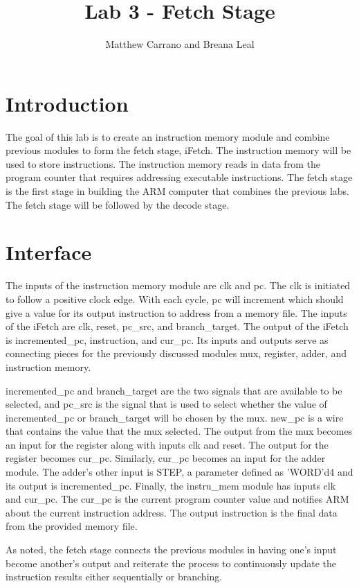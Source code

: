 \documentclass{article}
\author{Matthew Carrano and Breana Leal}
\title{Lab 3 - Fetch Stage}
\begin{document}
\maketitle

\section{Introduction}
The goal of this lab is to create an instruction memory module and combine previous modules to form the fetch stage, iFetch.  The instruction memory  will be used to store instructions. The instruction memory reads in data from the program counter that requires addressing executable instructions. The fetch stage is the first stage in building the ARM computer that combines the previous labs. The fetch stage will be followed by the decode stage.
  
\section{Interface}
The inputs of the instruction memory module are clk and pc. The clk is initiated to follow a positive clock edge. With each cycle, pc will increment which should give a value for its output instruction to address from a memory file.  
The inputs of the iFetch are clk, reset, pc\_src, and branch\_target. The output of the iFetch is incremented\_pc, instruction, and cur\_pc. Its inputs and outputs serve as connecting pieces for the previously discussed modules mux, register, adder, and instruction memory.

incremented\_pc and branch\_target are the two signals that are available to be selected, and pc\_src is the signal that is used to select whether the value of incremented\_pc or branch\_target will be chosen by the mux. new\_pc is a wire that contains the value that the mux selected. The output from the mux becomes an input for the register along with inputs clk and reset. The output for the register becomes cur\_pc. Similarly, cur\_pc becomes an input for the adder module. The adder's other input is STEP, a parameter defined as 'WORD'd4 and its output is incremented\_pc. Finally, the instru\_mem module has inputs clk and cur\_pc. The cur\_pc is the current program counter value and notifies ARM about the current instruction address. The output instruction is the final data from the provided memory file. 

As noted, the fetch stage connects the previous modules in having one's input become another's output and reiterate the process to continuously update the instruction results either sequentially or branching.
\end{document}
